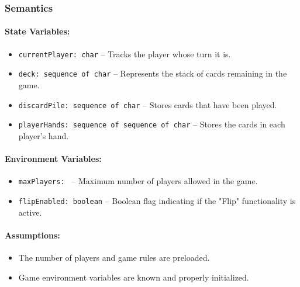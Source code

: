 \documentclass[12pt, titlepage]{article}
\begin{document}
\subsubsection{Semantics}

\paragraph{State Variables:}
\begin{itemize}
    \item \texttt{currentPlayer: char} -- Tracks the player whose turn it is.
    \item \texttt{deck: sequence of char} -- Represents the stack of cards remaining in the game.
    \item \texttt{discardPile: sequence of char} -- Stores cards that have been played.
    \item \texttt{playerHands: sequence of sequence of char} -- Stores the cards in each player's hand.
\end{itemize}

\paragraph{Environment Variables:}
\begin{itemize}
    \item \texttt{maxPlayers: } -- Maximum number of players allowed in the game.
    \item \texttt{flipEnabled: boolean} -- Boolean flag indicating if the "Flip" functionality is active.
\end{itemize}

\paragraph{Assumptions:}
\begin{itemize}
    \item The number of players and game rules are preloaded.
    \item Game environment variables are known and properly initialized.
\end{itemize}
\end{document}
